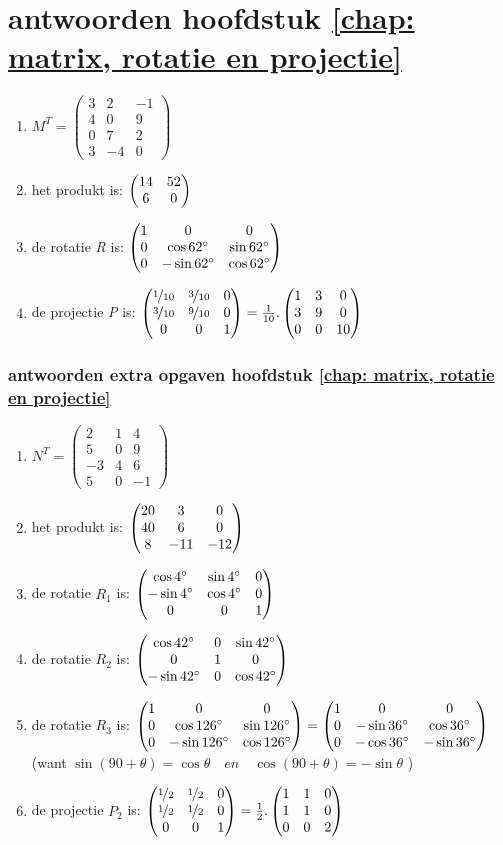\section{antwoorden  hoofdstuk \ref{chap: matrix, rotatie en projectie}}
\begin{enumerate}
	\item  
	$ M^{T} =	\begin{pmatrix}
	3 & 2 & -1\\
	4&0&9\\
	0&7&2\\
	3&-4&0 
	\end{pmatrix} $
	\item
	het produkt is:  $ \begin{pmatrix} 14&52 \\ 6&0 \end{pmatrix}  $
	\item
	de rotatie \textit{R} is:  
	$ \begin{pmatrix} 1&0&0 \\ 0&\cos  62 \degree  & \sin 62 \degree \\ 0& -\sin 62 \degree & \cos 62 \degree \end{pmatrix}  $
	\item
	de projectie \textit{P} is:  
	$ \begin{pmatrix} \nicefrac{1}{10}&\nicefrac{3}{10}&0 \\ \nicefrac{3}{10}&\nicefrac{9}{10}  & 0 \\ 0& 0 & 1 \end{pmatrix}  
	= \frac{1}{10} .\begin{pmatrix} 1&3&0 \\ 3&9  & 0 \\ 0& 0 & 10 \end{pmatrix} $    
	
\end{enumerate}

\subsubsection{antwoorden extra opgaven hoofdstuk \ref{chap: matrix, rotatie en projectie}}
\begin{enumerate}
	\item
	$ N^{T} =	\begin{pmatrix}
	2 & 1 & 4\\
	5&0&9\\
	-3&4&6\\
	5&0&-1 
	\end{pmatrix} $
	\item
	het produkt is:  
	$ \begin{pmatrix} 20&3&0 \\ 40&6&0 \\ 8&-11&-12 \end{pmatrix} $
	\item    de rotatie   \textit{$ R_1  $}  is:  
	$ \begin{pmatrix} \cos  4 \degree  & \sin 4 \degree &0 \\  -\sin 4 \degree & \cos 4 \degree&0 \\ 0&0&1 \end{pmatrix} $
	\item de rotatie   \textit{$ R_2  $}  is:  
	$ \begin{pmatrix} \cos  42 \degree  & 0& \sin 42 \degree  \\ 0&1&0 \\  -\sin 42\degree &  0 &\cos 42 \degree \end{pmatrix} 
	$
	\item     de rotatie \textit{$ R_3  $} is:  
	$ \begin{pmatrix} 1&0&0 \\ 0&\cos  126 \degree  & \sin 126 \degree \\ 0& -\sin 126 \degree & \cos 126 \degree \end{pmatrix}  
	= \begin{pmatrix} 1&0&0 \\ 0&-\sin  36 \degree  & \cos 36 \degree \\ 0& -\cos 36 \degree & -\sin 36 \degree \end{pmatrix}  $ \\
	(want $ \sin(90+\theta)  = \cos \theta \quad en \quad \cos(90+\theta)  = -\sin \theta $ )
	\item   de projectie \textit{ $ P_2 $ } is:  
	$ \begin{pmatrix} \nicefrac{1}{2}&\nicefrac{1}{2}&0 \\ \nicefrac{1}{2}&\nicefrac{1}{2}  & 0 \\ 0& 0 & 1 \end{pmatrix}  
	= \frac{1}{2} .\begin{pmatrix} 1&1&0 \\ 1&1  & 0 \\ 0& 0 & 2 \end{pmatrix} $    
	
\end{enumerate}

